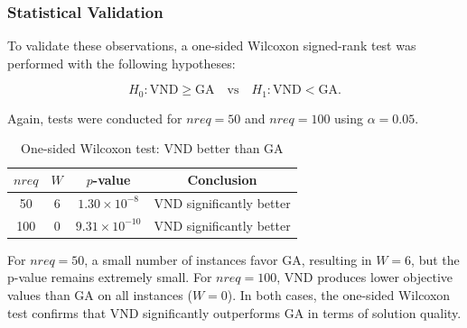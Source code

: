 \documentclass[12pt]{article}
\begin{document}
\subsubsection{Statistical Validation}

To validate these observations, a one-sided Wilcoxon signed-rank test was
performed with the following hypotheses:

\[
H_0: \text{VND} \ge \text{GA} \quad \text{vs} \quad
H_1: \text{VND} < \text{GA}.
\]

Again, tests were conducted for $nreq=50$ and $nreq=100$ using $\alpha = 0.05$.

\begin{table}[h]
\centering
\caption{One-sided Wilcoxon test: VND better than GA}
\label{tab:one_vnd_ga}
\begin{tabular}{c c c c}
\hline
$nreq$ & $W$ & $p$-value & Conclusion \\
\hline
50  & 6 & $1.30 \times 10^{-8}$ & VND significantly better \\
100 & 0 & $9.31 \times 10^{-10}$ & VND significantly better \\
\hline
\end{tabular}
\end{table}

For $nreq=50$, a small number of instances favor GA, resulting in $W=6$, but the
p-value remains extremely small. For $nreq=100$, VND produces lower objective
values than GA on all instances ($W=0$). In both cases, the one-sided Wilcoxon
test confirms that VND significantly outperforms GA in terms of solution
quality.
\end{document}
